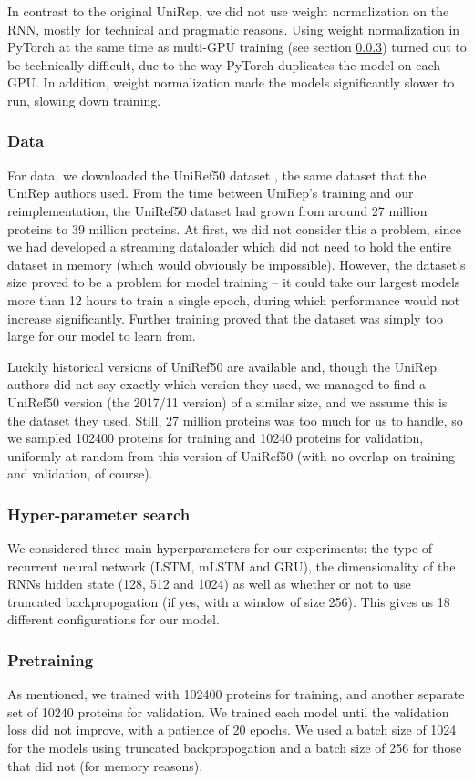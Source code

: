 \documentclass[a4paper,12pt]{article}
\begin{document}
In contrast to the original UniRep, we did not use weight normalization on the RNN, mostly for technical and pragmatic reasons. Using weight normalization in PyTorch at the same time as multi-GPU training (see section \ref{section:pretraining}) turned out to be technically difficult, due to the way PyTorch duplicates the model on each GPU. In addition, weight normalization made the models significantly slower to run, slowing down training.

\subsubsection{Data}
For data, we downloaded the UniRef50 dataset \cite{uniprot}, the same dataset that the UniRep authors used. From the time between UniRep's training and our reimplementation, the UniRef50 dataset had grown from around 27 million proteins to 39 million proteins. At first, we did not consider this a problem, since we had developed a streaming dataloader which did not need to hold the entire dataset in memory (which would obviously be impossible). However, the dataset's size proved to be a problem for model training -- it could take our largest models more than 12 hours to train a single epoch, during which performance would not increase significantly. Further training proved that the dataset was simply too large for our model to learn from.

Luckily historical versions of UniRef50 are available and, though the UniRep authors did not say exactly which version they used, we managed to find a UniRef50 version (the 2017/11 version) of a similar size, and we assume this is the dataset they used. Still, 27 million proteins was too much for us to handle, so we sampled 102400 proteins for training and 10240 proteins for validation, uniformly at random from this version of UniRef50 (with no overlap on training and validation, of course).

\subsubsection{Hyper-parameter search}
\label{section:hyperparam}
We considered three main hyperparameters for our experiments: the type of recurrent neural network (LSTM, mLSTM and GRU), the dimensionality of the RNNs hidden state (128, 512 and 1024) as well as whether or not to use truncated backpropogation (if yes, with a window of size 256). This gives us 18 different configurations for our model.

\subsubsection{Pretraining}
\label{section:pretraining}
As mentioned, we trained with 102400 proteins for training, and another separate set of 10240 proteins for validation. We trained each model until the validation loss did not improve, with a patience of 20 epochs. We used a batch size of 1024 for the models using truncated backpropogation and a batch size of 256 for those that did not (for memory reasons). 
\end{document}
